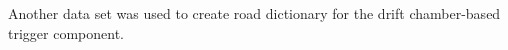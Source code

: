 Another data set was used to create road dictionary for the drift chamber-based trigger component.

